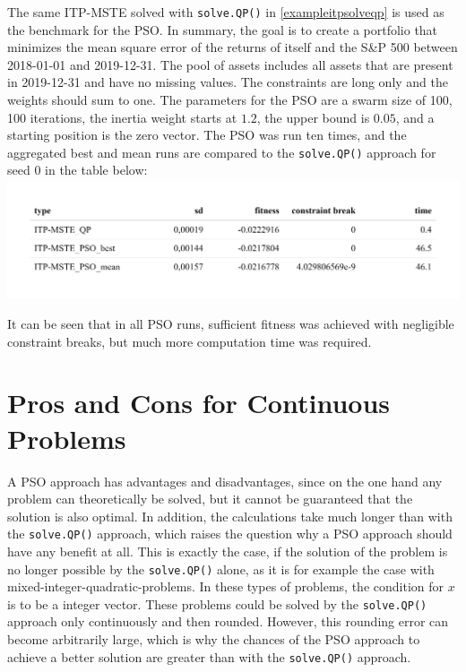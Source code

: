 \documentclass[
  oneside]{book}
\begin{document}
The same ITP-MSTE solved with \texttt{solve.QP()} in \ref{exampleitpsolveqp} is used as the benchmark for the PSO. In summary, the goal is to create a portfolio that minimizes the mean square error of the returns of itself and the S\&P 500 between 2018-01-01 and 2019-12-31. The pool of assets includes all assets that are present in 2019-12-31 and have no missing values. The constraints are long only and the weights should sum to one. The parameters for the PSO are a swarm size of 100, 100 iterations, the inertia weight starts at \(1.2\), the upper bound is \(0.05\), and a starting position is the zero vector. The PSO was run ten times, and the aggregated best and mean runs are compared to the \texttt{solve.QP()} approach for seed 0 in the table below:
\includegraphics{Master_Thesis_files/figure-latex/pso8-1.png}

It can be seen that in all PSO runs, sufficient fitness was achieved with negligible constraint breaks, but much more computation time was required.

\hypertarget{pros-and-cons-for-continuous-problems}{%
\section{Pros and Cons for Continuous Problems}\label{pros-and-cons-for-continuous-problems}}

A PSO approach has advantages and disadvantages, since on the one hand any problem can theoretically be solved, but it cannot be guaranteed that the solution is also optimal. In addition, the calculations take much longer than with the \texttt{solve.QP()} approach, which raises the question why a PSO approach should have any benefit at all. This is exactly the case, if the solution of the problem is no longer possible by the \texttt{solve.QP()} alone, as it is for example the case with mixed-integer-quadratic-problems. In these types of problems, the condition for \(x\) is to be a integer vector. These problems could be solved by the \texttt{solve.QP()} approach only continuously and then rounded. However, this rounding error can become arbitrarily large, which is why the chances of the PSO approach to achieve a better solution are greater than with the \texttt{solve.QP()} approach.
\end{document}
